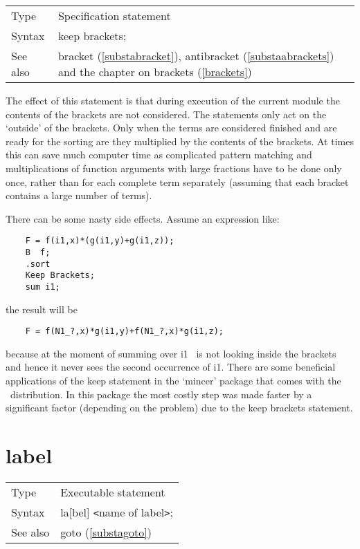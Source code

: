 \noindent \begin{tabular}{ll}
Type & Specification statement\\
Syntax & keep brackets; \\
See also & bracket (\ref{substabracket}), antibracket 
     (\ref{substaabrackets}) and the chapter on brackets 
     (\ref{brackets})
\end{tabular} \vspace{4mm}

\noindent The effect 
of this statement is that during execution of the current module the 
contents of the brackets are not considered. The statements only act on the 
`outside' of the brackets. Only when the terms are considered finished and 
are ready for the sorting are they multiplied by the contents of the 
brackets. At times this can save much computer time as complicated pattern 
matching and multiplications of function arguments with large fractions 
have to be done only once, rather than for each complete term separately 
(assuming that each bracket contains a large number of terms).

\noindent There can be some nasty side effects. Assume an expression like:
\begin{verbatim}
    F = f(i1,x)*(g(i1,y)+g(i1,z));
    B  f;
    .sort
    Keep Brackets;
    sum i1;
\end{verbatim}
the result will be
\begin{verbatim}
    F = f(N1_?,x)*g(i1,y)+f(N1_?,x)*g(i1,z);
\end{verbatim}
because at the moment of summing over i1 \FORM\ is not looking inside the 
brackets and hence it never sees the second occurrence of i1. There are 
some beneficial applications of the keep statement in the 
`mincer' package that comes with the \FORM\ distribution. In 
this package the most costly step was made faster by a significant factor 
(depending on the problem) due to the keep brackets statement. 
\vspace{10mm}


\section{label}
\label{substalabel}

\noindent \begin{tabular}{ll}
Type & Executable statement\\
Syntax & la[bel] {\tt<}name of label{\tt>};
\\ See also & goto (\ref{substagoto})
\end{tabular} \vspace{4mm}

